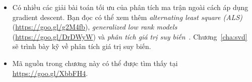 \begin{itemize}
 
    \item Có nhiều các giải bài toán tối ưu của phân tích ma trận ngoài cách áp dụng gradient descent. Bạn đọc có thể xem thêm
    \textit{alternating least square (ALS)} (\url{https://goo.gl/g2M4fb}),
    \textit{generalized low rank models} (\url{https://goo.gl/DrDWyW}) và
    \textit{phân tích giá trị suy biến}~\cite{sarwar2002incremental,paterek2007improving}.
    Chương~\ref{cha:svd} sẽ trình bày kỹ về phân tích giá trị suy biến. 

    \item Mã nguồn trong chương này có thể được tìm thấy tại \url{https://goo.gl/XbbFH4}.
\end{itemize} 
 
 
 
 
